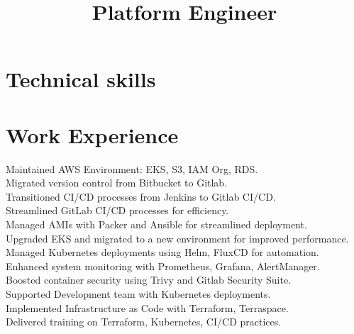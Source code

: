 \documentclass[10pt,a4paper,sans]{moderncv} %
\title{Platform Engineer}
\begin{document}
\makecvtitle %




\section{Technical skills}



\section{Work Experience}

{
	Maintained AWS Environment: EKS, S3, IAM Org, RDS.\\
	Migrated version control from Bitbucket to Gitlab.\\
	Transitioned CI/CD processes from Jenkins to Gitlab CI/CD.\\
	Streamlined GitLab CI/CD processes for efficiency.\\
	Managed AMIs with Packer and Ansible for streamlined deployment.\\
	Upgraded EKS and migrated to a new environment for improved performance.\\
	Managed Kubernetes deployments using Helm, FluxCD for automation.\\
	Enhanced system monitoring with Prometheus, Grafana, AlertManager.\\
	Boosted container security using Trivy and Gitlab Security Suite.\\
	Supported Development team with Kubernetes deployments.\\
	Implemented Infrastructure as Code with Terraform, Terraspace.\\
	Delivered training on Terraform, Kubernetes, CI/CD practices.\\
}
\end{document}
